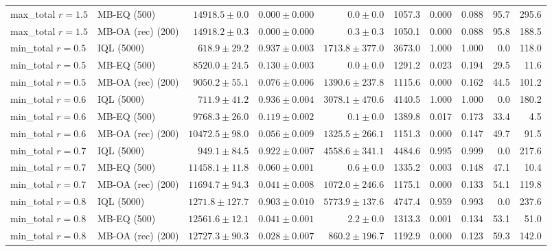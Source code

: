 \begin{tabular}{llrrrrrrrr}
max\_total $r=1.5$ & MB-EQ (500) & $\mathbf{14918.5 \pm 0.0}$ & $\mathbf{0.000 \pm 0.000}$ & $0.0 \pm 0.0$ & 1057.3 & 0.000 & 0.088 & 95.7 & 295.6 \\
max\_total $r=1.5$ & MB-OA (rec) (200) & $\mathbf{14918.2 \pm 0.3}$ & $\mathbf{0.000 \pm 0.000}$ & $0.3 \pm 0.3$ & 1050.1 & 0.000 & 0.088 & 95.8 & 188.5 \\
\midrule
min\_total $r=0.5$ & IQL (5000) & $618.9 \pm 29.2$ & $0.937 \pm 0.003$ & $1713.8 \pm 377.0$ & 3673.0 & 1.000 & 1.000 & 0.0 & 118.0 \\
min\_total $r=0.5$ & MB-EQ (500) & $8520.0 \pm 24.5$ & $0.130 \pm 0.003$ & $0.0 \pm 0.0$ & 1291.2 & 0.023 & 0.194 & 29.5 & 11.6 \\
min\_total $r=0.5$ & MB-OA (rec) (200) & $\mathbf{9050.2 \pm 55.1}$ & $\mathbf{0.076 \pm 0.006}$ & $1390.6 \pm 237.8$ & 1115.6 & 0.000 & 0.162 & 44.5 & 101.2 \\
min\_total $r=0.6$ & IQL (5000) & $711.9 \pm 41.2$ & $0.936 \pm 0.004$ & $3078.1 \pm 470.6$ & 4140.5 & 1.000 & 1.000 & 0.0 & 180.2 \\
min\_total $r=0.6$ & MB-EQ (500) & $9768.3 \pm 26.0$ & $0.119 \pm 0.002$ & $0.1 \pm 0.0$ & 1389.8 & 0.017 & 0.173 & 33.4 & 4.5 \\
min\_total $r=0.6$ & MB-OA (rec) (200) & $\mathbf{10472.5 \pm 98.0}$ & $\mathbf{0.056 \pm 0.009}$ & $1325.5 \pm 266.1$ & 1151.3 & 0.000 & 0.147 & 49.7 & 91.5 \\
min\_total $r=0.7$ & IQL (5000) & $949.1 \pm 84.5$ & $0.922 \pm 0.007$ & $4558.6 \pm 341.1$ & 4484.6 & 0.995 & 0.999 & 0.0 & 217.6 \\
min\_total $r=0.7$ & MB-EQ (500) & $11458.1 \pm 11.8$ & $0.060 \pm 0.001$ & $0.6 \pm 0.0$ & 1335.2 & 0.003 & 0.148 & 47.1 & 10.4 \\
min\_total $r=0.7$ & MB-OA (rec) (200) & $\mathbf{11694.7 \pm 94.3}$ & $\mathbf{0.041 \pm 0.008}$ & $1072.0 \pm 246.6$ & 1175.1 & 0.000 & 0.133 & 54.1 & 119.8 \\
min\_total $r=0.8$ & IQL (5000) & $1271.8 \pm 127.7$ & $0.903 \pm 0.010$ & $5773.9 \pm 137.6$ & 4747.4 & 0.959 & 0.993 & 0.0 & 237.6 \\
min\_total $r=0.8$ & MB-EQ (500) & $12561.6 \pm 12.1$ & $0.041 \pm 0.001$ & $2.2 \pm 0.0$ & 1313.3 & 0.001 & 0.134 & 53.1 & 51.0 \\
min\_total $r=0.8$ & MB-OA (rec) (200) & $\mathbf{12727.3 \pm 90.3}$ & $\mathbf{0.028 \pm 0.007}$ & $860.2 \pm 196.7$ & 1192.9 & 0.000 & 0.123 & 59.3 & 142.0 \\
\bottomrule
\end{tabular}
